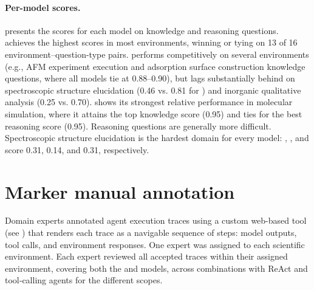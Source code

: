 \paragraph{Per-model scores.}  presents the scores for each model on knowledge and reasoning questions. \claudesonnet achieves the highest scores in most environments, winning or tying on 13 of 16 environment–question-type pairs. \gptfourO performs competitively on several environments (e.g., AFM experiment execution and adsorption surface construction knowledge questions, where all models tie at 0.88–0.90), but lags substantially behind on spectroscopic structure elucidation (0.46 vs. 0.81 for \claudesonnet) and inorganic qualitative analysis (0.25 vs. 0.70). \gptoss shows its strongest relative performance in molecular simulation, where it attains the top knowledge score (0.95) and ties for the best reasoning score (0.95). Reasoning questions are generally more difficult. Spectroscopic structure elucidation is the hardest domain for every model: \claudesonnet, \gptfourO, and \gptoss score 0.31, 0.14, and 0.31, respectively.

\begin{table}[H]
    \centering
    \caption{\textbf{Q\&A Scores for each of the analyzed models across the different tasks.} Bold text indicates the best scores for each of the topics. \textit{Knowledge questions} evaluate the factual knowledge needed to solve the agentic tasks, while the \textit{Reasoning Questions} aim to simulate the reasoning-related processes that agents face during problem-solving.}
    \label{tab:qa-scores}
    \resizebox{\textwidth}{!}{
    
    }
\end{table}


\section{Marker manual annotation} \label{app:manual_annotation_description}

Domain experts annotated agent execution traces using a custom web-based tool (see ) that renders each trace as a navigable sequence of steps: model outputs, tool calls, and environment responses. One expert was assigned to each scientific environment. Each expert reviewed all accepted traces within their assigned environment, covering both the \gptfourO and \claudesonnet models, across combinations with ReAct and tool‑calling agents for the different scopes.

